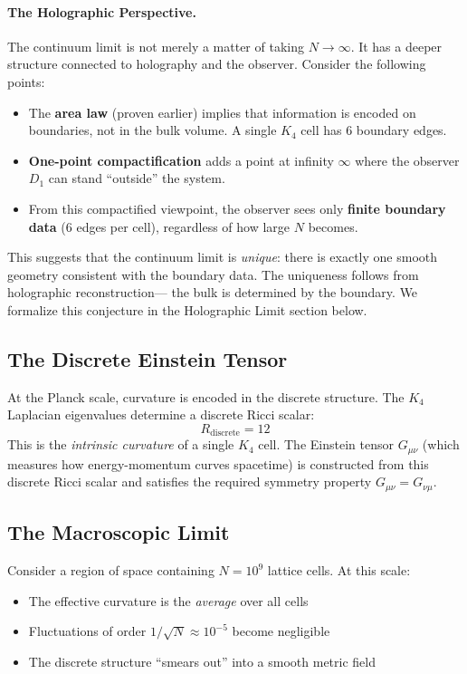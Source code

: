 \documentclass[11pt,a4paper]{book}
\begin{document}
\paragraph{The Holographic Perspective.}

The continuum limit is not merely a matter of taking $N \to \infty$. It has a deeper structure 
connected to holography and the observer. Consider the following points:

\begin{itemize}
\item The \textbf{area law} (proven earlier) implies that information is encoded on boundaries, 
not in the bulk volume. A single $K_4$ cell has 6 boundary edges.
\item \textbf{One-point compactification} adds a point at infinity $\infty$ where the observer 
$D_1$ can stand ``outside'' the system.
\item From this compactified viewpoint, the observer sees only \textbf{finite boundary data} 
(6 edges per cell), regardless of how large $N$ becomes.
\end{itemize}

This suggests that the continuum limit is \emph{unique}: there is exactly one smooth geometry 
consistent with the boundary data. The uniqueness follows from holographic reconstruction---
the bulk is determined by the boundary. We formalize this conjecture in the Holographic Limit 
section below.

\subsection{The Discrete Einstein Tensor}

At the Planck scale, curvature is encoded in the discrete structure. The $K_4$ Laplacian 
eigenvalues determine a discrete Ricci scalar:
\[
R_{\text{discrete}} = 12
\]
This is the \emph{intrinsic curvature} of a single $K_4$ cell. The Einstein tensor 
$G_{\mu\nu}$ (which measures how energy-momentum curves spacetime) is constructed from 
this discrete Ricci scalar and satisfies the required symmetry property $G_{\mu\nu} = G_{\nu\mu}$.

\subsection{The Macroscopic Limit}

Consider a region of space containing $N = 10^9$ lattice cells. At this scale:
\begin{itemize}
\item The effective curvature is the \emph{average} over all cells
\item Fluctuations of order $1/\sqrt{N} \approx 10^{-5}$ become negligible
\item The discrete structure ``smears out'' into a smooth metric field
\end{itemize}
\end{document}
